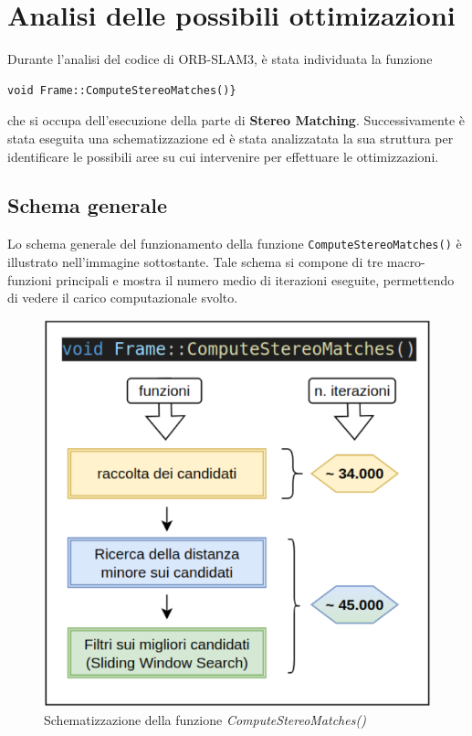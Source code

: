 \documentclass[12pt,a4paper]{report}
\begin{document}
\section{Analisi delle possibili ottimizazioni}

Durante l'analisi del codice di ORB-SLAM3, è stata individuata la funzione 
\begin{lstlisting}
void Frame::ComputeStereoMatches()}
\end{lstlisting} 
che si occupa dell'esecuzione della parte di \textbf{Stereo Matching}. 
Successivamente è stata eseguita una schematizzazione ed è stata analizzatata la sua struttura per identificare le possibili aree su cui intervenire per effettuare le ottimizzazioni.

\subsection{Schema generale}

Lo schema generale del funzionamento della funzione \texttt{ComputeStereoMatches()} è illustrato nell'immagine sottostante. Tale schema si compone di tre macro-funzioni principali e mostra il numero medio di iterazioni eseguite, permettendo di vedere il carico computazionale svolto.

\begin{figure}[h]
    \centering
    \includegraphics[width=0.8\linewidth]{img/ComputeStereo_schema.png}
    \caption{Schematizzazione della funzione \textit{ComputeStereoMatches()} }
\end{figure}
\end{document}
